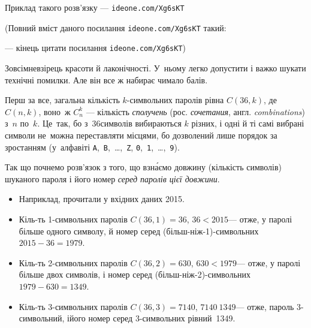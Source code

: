 \documentclass[14pt,a4paper]{extarticle}
\renewcommand{\baselinestretch}{1.3125}
\begin{document}
Приклад такого розв’язку --- 
\verb"ideone.com/Xg6sKT"


{\color{green}\begin{small}

\renewcommand{\baselinestretch}{0.875}

(Повний вміст даного посилання \verb"ideone.com/Xg6sKT" такий:

--- кінець цитати посилання \verb"ideone.com/Xg6sKT")

\end{small}}


\hspace{0.5em plus 1em}%
Зовсім\nolinebreak[2] не\nolinebreak[3] взірець красоти й лаконічності. У~ньому легко допустити і важко шукати технічні помилки. Але він все ж набирає чимало балів.

Перш за все, загальна кількість $k$-сим\-воль\-них паролів рівна $C(36, k)$, де $C(n,k)$, воно~ж $C_n^k$ --- кількість \emph{сполучень} (рос. \emph{сочетания}, англ. \emph{combinations}) з~$n$ по~$k$. Це~так, бо з~36\nolinebreak[3] символів вибираються $k$ різних, і одні й ті самі вибрані символи не~можна переставляти місцями, бо дозволений лише порядок за зростанням (у~алфавіті \texttt{A},~\texttt{B},~\dots,~\texttt{Z}, \texttt{0},~\texttt{1},~\dots,~\texttt{9}).

Так що почнемо розв’язок з того, що взн\'{а}ємо довжину (кількість символів) шуканого пароля і його номер \emph{серед паролів цієї довжини}.

\begin{small}
\begin{itemize}[leftmargin=*,itemsep=0pt,partopsep=0pt,topsep=0pt,parsep=0pt]
\item[] Наприклад, прочитали у вхідних даних 2015.

\item Кіль-ть 1-символьних паролів ${C(36,1){=}36}$,\hspace{0.5em plus 1em} ${36{<}2015}$\nolinebreak[3] --- отже, у паролі більше одного символу, й номер серед (більш-ніж-1)-символьних ${2015-36=1979}$.

\item Кіль-ть 2-символьних паролів ${C(36,2){=}630}$,\hspace{0.5em plus 1em} ${630{<}1979}$\nolinebreak[3] --- отже, у паролі більше двох символів, і номер серед (більш-ніж-2)-символьних ${1979-630=1349}$.

\item Кіль-ть 3-символьних паролів ${C(36,3){=}7140}$,\hspace{0.5em plus 1em} ${7140{\>}1349}$\nolinebreak[3] --- отже, пароль 3-символьний, і\nolinebreak[3] його номер серед 3-символьних рівний~1349.

\end{itemize}
\end{small}
\end{document}
